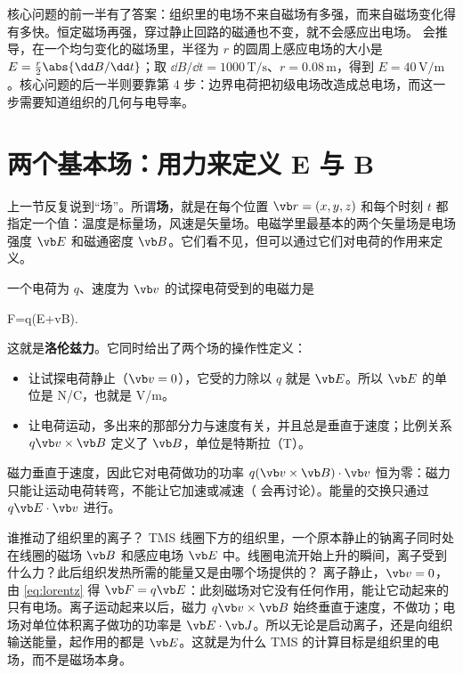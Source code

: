 \begin{intuition}
核心问题的前一半有了答案：组织里的电场不来自磁场有多强，而来自磁场变化得有多快。恒定磁场再强，穿过静止回路的磁通也不变，就不会感应出电场。 会推导，在一个均匀变化的磁场里，半径为 $r$ 的圆周上感应电场的大小是 $E=\tfrac r2\abs{\dd B/\dd t}$；取 $\dd B/\dd t=1000\,\mathrm{T/s}$、$r=0.08\,\mathrm m$，得到 $E=40\,\mathrm{V/m}$。核心问题的后一半则要靠第 4 步：边界电荷把初级电场改造成总电场，而这一步需要知道组织的几何与电导率。
\end{intuition}

\section{两个基本场：用力来定义 E 与 B}\label{sec:intro-fields}

上一节反复说到“场”。所谓\textbf{场}，就是在每个位置 $\vb r=(x,y,z)$ 和每个时刻 $t$ 都指定一个值：温度是标量场，风速是矢量场。电磁学里最基本的两个矢量场是电场强度 $\vb E$ 和磁通密度 $\vb B$。它们看不见，但可以通过它们对电荷的作用来定义。

一个电荷为 $q$、速度为 $\vb v$ 的试探电荷受到的电磁力是
\begin{keyeq}
\vb F=q\bigl(\vb E+\vb v\times\vb B\bigr).
\label{eq:lorentz}
\end{keyeq}
这就是\textbf{洛伦兹力}。它同时给出了两个场的操作性定义：
\begin{itemize}
\item 让试探电荷静止（$\vb v=0$），它受的力除以 $q$ 就是 $\vb E$。所以 $\vb E$ 的单位是 N/C，也就是 V/m。
\item 让电荷运动，多出来的那部分力与速度有关，并且总是垂直于速度；比例关系 $q\vb v\times\vb B$ 定义了 $\vb B$，单位是特斯拉（T）。
\end{itemize}
磁力垂直于速度，因此它对电荷做功的功率 $q(\vb v\times\vb B)\cdot\vb v$ 恒为零：磁力只能让运动电荷转弯，不能让它加速或减速（ 会再讨论）。能量的交换只通过 $q\vb E\cdot\vb v$ 进行。

\begin{example}{谁推动了组织里的离子？}\label{ex:intro-ions}
TMS 线圈下方的组织里，一个原本静止的钠离子同时处在线圈的磁场 $\vb B$ 和感应电场 $\vb E$ 中。线圈电流开始上升的瞬间，离子受到什么力？此后组织发热所需的能量又是由哪个场提供的？
\solution
离子静止，$\vb v=0$，由 \eqref{eq:lorentz} 得 $\vb F=q\vb E$：此刻磁场对它没有任何作用，能让它动起来的只有电场。离子运动起来以后，磁力 $q\vb v\times\vb B$ 始终垂直于速度，不做功；电场对单位体积离子做功的功率是 $\vb E\cdot\vb J$。所以无论是启动离子，还是向组织输送能量，起作用的都是 $\vb E$。这就是为什么 TMS 的计算目标是组织里的电场，而不是磁场本身。
\end{example}

